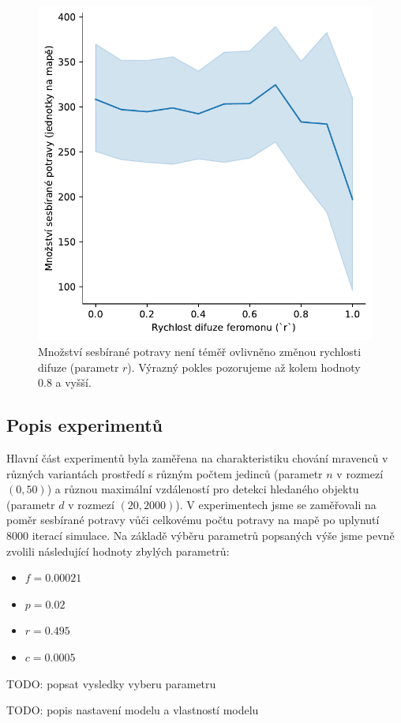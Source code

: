 \documentclass[10pt,a4paper,twocolumn]{article}
\begin{document}
\begin{figure}[tb]
  \centering
  \includegraphics[width=0.9\linewidth]{images/grid_search_2_difusion.pdf}
  \caption{Množství sesbírané potravy není téměř ovlivněno změnou rychlosti 
  difuze (parametr $r$). Výrazný pokles pozorujeme až kolem hodnoty $0.8$ 
  a vyšší.}
  \label{fig:grid_search_2_difusion}
\end{figure}


\subsection*{Popis experimentů}
Hlavní část experimentů byla zaměřena na charakteristiku chování mravenců v
různých variantách prostředí s různým počtem jedinců (parametr $n$ v rozmezí 
$(0, 50)$) a různou maximální vzdáleností pro detekci hledaného objektu 
(parametr $d$ v rozmezí $(20, 2000)$). V experimentech jsme se zaměřovali 
na poměr sesbírané potravy vůči celkovému počtu potravy na mapě po uplynutí
$8000$ iterací simulace. Na základě výběru parametrů popsaných výše jsme 
pevně zvolili následující hodnoty zbylých parametrů:

\begin{itemize}
  \item $f = 0.00021$
  \item $p = 0.02$
  \item $r = 0.495$
  \item $c = 0.0005$
\end{itemize}


TODO: popsat vysledky vyberu parametru

TODO: popis nastavení modelu a vlastností modelu




\end{document}
